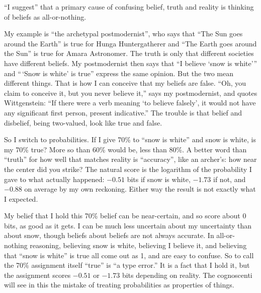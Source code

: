 
``I suggest'' that a primary cause of confusing belief, truth and reality is thinking of beliefs as all-or-nothing.

My example is ``the archetypal postmodernist'', who says that ``The Sun goes around the Earth'' is true for Hunga Huntergatherer and ``The Earth goes around the Sun'' is true for Amara Astronomer.  The truth is only that different societies have different beliefs. My postmodernist then says that ``I believe `snow is white''' and ``\,`Snow is white' is true'' express the same opinion. But the two mean different things. That is how I can conceive that my beliefs are false. ``Oh, you claim to conceive it, but you never believe it,'' says my postmodernist, and quotes Wittgenstein: ``If there were a verb meaning `to believe falsely', it would not have any significant first person, present indicative.''  The trouble is that belief and disbelief, being two-valued, look like true and false.

So I switch to probabilities. If I give 70\% to ``snow is white'' and snow is white, is my 70\% true? More so than 60\% would be, less than 80\%. A better word than ``truth'' for how well that matches reality is ``accuracy'', like an archer's: how near the center did you strike? The natural score is the logarithm of the probability I gave to what actually happened: $-0.51$ bits if snow is white, $-1.73$ if not, and $-0.88$ on average by my own reckoning. Either way the result is not exactly what I expected.

My belief that I hold this 70\% belief can be near-certain, and so score about 0 bits, as good as it gets. I can be much less uncertain about my uncertainty than about snow, though beliefs about beliefs are not always accurate. In all-or-nothing reasoning, believing snow is white, believing I believe it, and believing that ``snow is white'' is true all come out as 1, and are easy to confuse. So to call the 70\% assignment itself ``true'' is ``a type error.'' It is a fact that I hold it, but the assignment scores $-0.51$ or $-1.73$ bits depending on reality. The cognoscenti will see in this the mistake of treating probabilities as properties of things.

